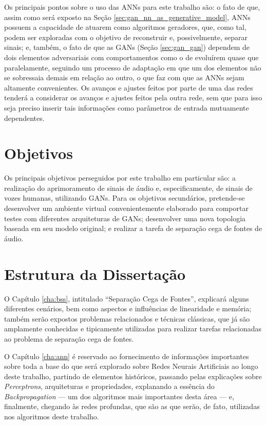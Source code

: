 Os principais pontos sobre o uso das ANNs para este trabalho são: o fato de que, assim como será exposto na Seção \ref{sec:gan_nn_as_generative_model}, ANNs possuem a capacidade de atuarem como algoritmos geradores, que, como tal, podem ser exploradas com o objetivo de reconstruir e, possivelmente, separar sinais; e, também, o fato de que as GANs (Seção \ref{sec:gan_gan}) dependem de dois elementos adversariais com comportamentos como o de evoluírem quase que paralelamente, seguindo um processo de adaptação em que um dos elementos não se sobressaia demais em relação ao outro, o que faz com que as ANNs sejam altamente convenientes. Os avanços e ajustes feitos por parte de uma das redes tenderá a considerar os avanços e ajustes feitos pela outra rede, sem que para isso seja preciso inserir tais informações como parâmetros de entrada mutuamente dependentes.


\section{Objetivos}
\label{sec:intro_objectives}

Os principais objetivos perseguidos por este trabalho em particular são: a realização do aprimoramento de sinais de áudio e, especificamente, de sinais de vozes humanas, utilizando GANs. Para os objetivos secundários, pretende-se desenvolver um ambiente virtual convenientemente elaborado para comportar testes com diferentes arquiteturas de GANs; desenvolver uma nova topologia baseada em seu modelo original; e realizar a tarefa de separação cega de fontes de áudio.


\section{Estrutura da Dissertação}
\label{sec:intro_dissertation_structure}

O Capítulo \ref{cha:bss}, intitulado ``Separação Cega de Fontes'', explicará alguns diferentes cenários, bem como aspectos e influências de linearidade e memória; também  serão expostos problemas relacionados e técnicas clássicas, que já são amplamente conhecidas e tipicamente utilizadas para realizar tarefas relacionadas ao problema de separação cega de fontes.

O Capítulo \ref{cha:ann} é reservado ao fornecimento de informações importantes sobre toda a base do que será explorado sobre Redes Neurais Artificiais ao longo deste trabalho, partindo de elementos históricos, passando pelas explicações sobre \textit{Perceptrons}, arquiteturas e propriedades, explanando a essência do \textit{Backpropagation} --- um dos algoritmos mais importantes desta área --- e, finalmente, chegando às redes profundas, que são as que serão, de fato, utilizadas nos algoritmos deste trabalho.

